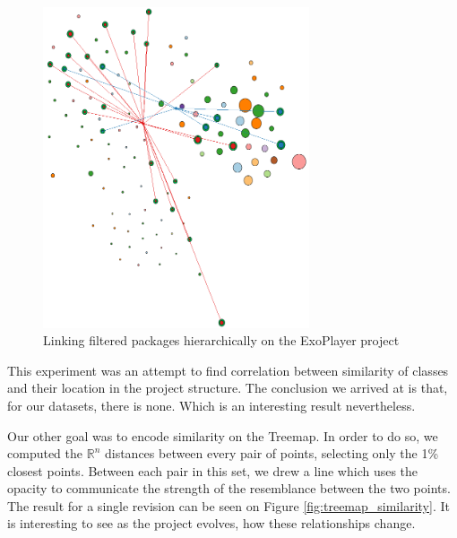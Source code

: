 \begin{figure}[H]
	\centering
	\includegraphics[width=0.7\textwidth]{figures/hier_two_sim_graph.png}
	\caption{Linking filtered packages hierarchically on the ExoPlayer project}
	\label{fig:hier_two_sim_graph}
\end{figure}

This experiment was an attempt to find correlation between similarity of classes and their location in the project structure. The conclusion we arrived at is that, for our datasets, there is none. Which is an interesting result nevertheless.

Our other goal was to encode similarity on the Treemap. In order to do so, we computed the $\mathbb{R}^{n}$ distances between every pair of points, selecting only the 1\% closest points. Between each pair in this set, we drew a line which uses the opacity to communicate the strength of the resemblance between the two points. The result for a single revision can be seen on Figure \ref{fig:treemap_similarity}. It is interesting to see as the project evolves, how these relationships change.

